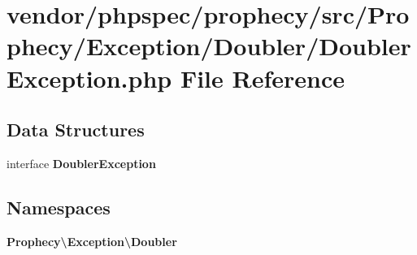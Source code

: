 \section{vendor/phpspec/prophecy/src/\+Prophecy/\+Exception/\+Doubler/\+Doubler\+Exception.php File Reference}
\label{_doubler_exception_8php}
\subsection*{Data Structures}
\begin{DoxyCompactItemize}
\item 
interface {\bf Doubler\+Exception}
\end{DoxyCompactItemize}
\subsection*{Namespaces}
\begin{DoxyCompactItemize}
\item 
 {\bf Prophecy\textbackslash{}\+Exception\textbackslash{}\+Doubler}
\end{DoxyCompactItemize}
